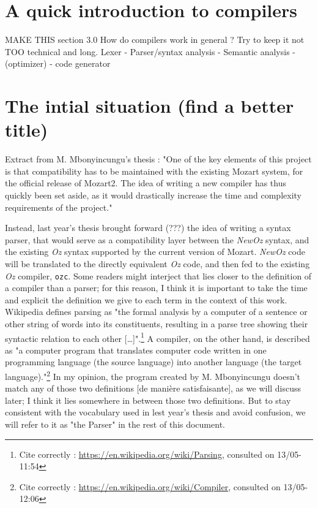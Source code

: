 
\section{A quick introduction to compilers}\label{sec:ch3-compilers}
MAKE THIS section 3.0
How do compilers work in general ?
Try to keep it not TOO technical and long.
Lexer - Parser/syntax analysis - Semantic analysis - (optimizer) - code generator

\section{The intial situation (find a better title)}\label{sec:ch3-Parser}
Extract from M. Mbonyincungu's thesis :
"One of the key elements of this project is that compatibility has to be maintained with the existing Mozart system, for the official release of Mozart2.
The idea of writing a new compiler has thus quickly been set aside, as it would drastically increase the time and complexity requirements of the project."\cite{jpthesis}

Instead, last year's thesis brought forward (???) the idea of writing a syntax parser, that would serve as a compatibility layer between the \textit{NewOz} syntax, and the existing \textit{Oz} syntax supported by the current version of Mozart.
\textit{NewOz} code will be translated to the directly equivalent \textit{Oz} code, and then fed to the existing \textit{Oz} compiler, \texttt{ozc}.
Some readers might interject that lies closer to the definition of a compiler than a parser;
for this reason, I think it is important to take the time and explicit the definition we give to each term in the context of this work.
Wikipedia defines parsing as "the formal analysis by a computer of a sentence or other string of words into its constituents, resulting in a parse tree showing their syntactic relation to each other [\ldots]".\footnote{Cite correctly : \url{https://en.wikipedia.org/wiki/Parsing}, consulted on 13/05-11:54}
A compiler, on the other hand, is described as "a computer program that translates computer code written in one programming language (the source language) into another language (the target language)."\footnote{Cite correctly : \url{https://en.wikipedia.org/wiki/Compiler}, consulted on 13/05-12:06}
In my opinion, the program created by M. Mbonyincungu doesn't match any of those two definitions [de manière satisfaisante], as we will discuss later;
I think it lies somewhere in between those two definitions.
But to stay consistent with the vocabulary used in lest year's thesis and avoid confusion, we will refer to it as "the Parser" in the rest of this document.

